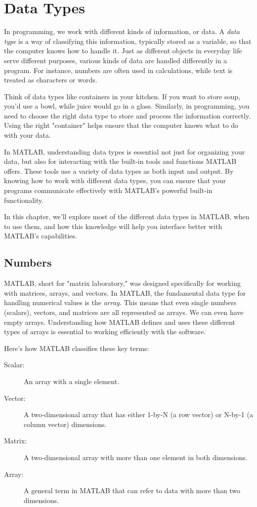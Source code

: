 \chapter{Data Types}
\label{c:datatypes}


In programming, we work with different kinds of information, or data. A \emph{data type} is a way of classifying this information, typically stored as a variable, so that the computer knows how to handle it. Just as different objects in everyday life serve different purposes, various kinds of data are handled differently in a program. For instance, numbers are often used in calculations, while text is treated as characters or words.

Think of data types like containers in your kitchen. If you want to store soup, you’d use a bowl, while juice would go in a glass. Similarly, in programming, you need to choose the right data type to store and process the information correctly. Using the right "container" helps ensure that the computer knows what to do with your data.

In MATLAB, understanding data types is essential not just for organizing your data, but also for interacting with the built-in tools and functions MATLAB offers. These tools use a variety of data types as both input and output. By knowing how to work with different data types, you can ensure that your programs communicate effectively with MATLAB’s powerful built-in functionality.

In this chapter, we'll explore most of the different data types in MATLAB, when to use them, and how this knowledge will help you interface better with MATLAB's capabilities.

\section{Numbers}

MATLAB, short for "matrix laboratory," was designed specifically for working with matrices, arrays, and vectors. In MATLAB, the fundamental data type for handling numerical values is the \emph{array}. This means that even single numbers (scalars), vectors, and matrices are all represented as arrays. We can even have empty arrays.  Understanding how MATLAB defines and uses these different types of arrays is essential to working efficiently with the software.

Here’s how MATLAB classifies these key terms:

\begin{description}
\item[Scalar:] An array with a single element.
\item[Vector:] A two-dimensional array that has either 1-by-N (a row vector) or N-by-1 (a column vector) dimensions.
\item[Matrix:] A two-dimensional array with more than one element in both dimensions.
\item[Array:] A general term in MATLAB that can refer to data with more than two dimensions.
\end{description}

